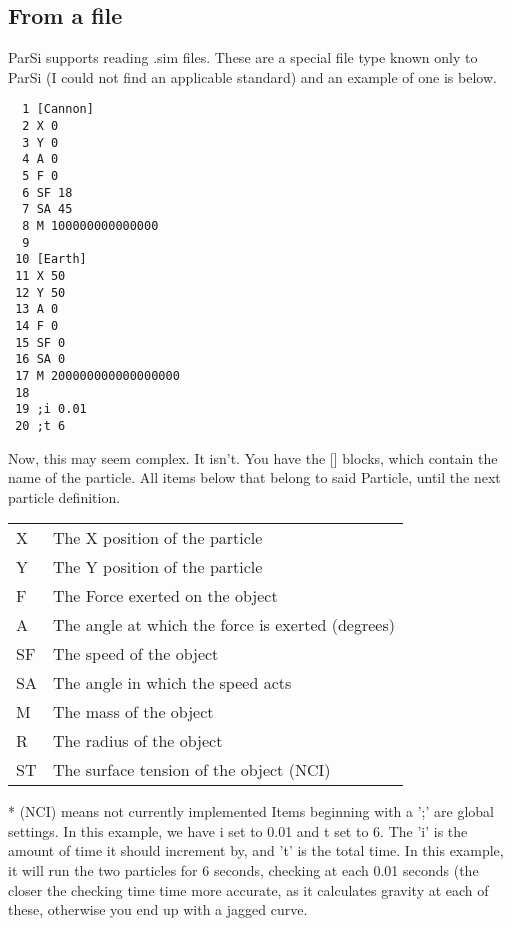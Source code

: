\documentclass[11pt]{article}
\begin{document}
\subsection {From a file}
ParSi supports reading .sim files. These are a special file type known only to ParSi (I could not find an applicable standard) and an example of one is below.
\begin {lstlisting}
  1 [Cannon]
  2 X 0
  3 Y 0
  4 A 0
  5 F 0
  6 SF 18
  7 SA 45
  8 M 100000000000000
  9 
 10 [Earth]
 11 X 50
 12 Y 50
 13 A 0
 14 F 0
 15 SF 0
 16 SA 0
 17 M 200000000000000000
 18 
 19 ;i 0.01
 20 ;t 6
\end{lstlisting}
Now, this may seem complex. It isn't. You have the [] blocks, which contain the name of the particle. All items below that belong to said Particle, until the next particle definition.\newline

\begin{center}
\begin{tabular}{ l l }
	X & The X position of the particle \\
	Y & The Y position of the particle \\
	F & The Force exerted on the object \\
	A & The angle at which the force is exerted (degrees) \\
	SF & The speed of the object \\
	SA & The angle in which the speed acts \\
	M & The mass of the object \\
	R & The radius of the object \\
	ST & The surface tension of the object (NCI) \\

\end{tabular}
\end{center}
* (NCI) means not currently implemented\newline
Items beginning with a ';' are global settings. In this example, we have i set to 0.01 and t set to 6. The 'i' is the amount of time it should increment by, and 't' is the total time. In this example, it will run the two particles for 6 seconds, checking at each 0.01 seconds (the closer the checking time time more accurate, as it calculates gravity at each of these, otherwise you end up with a jagged curve.
\end{document}
